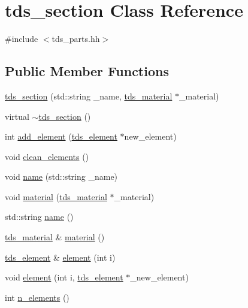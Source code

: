 \hypertarget{classtds__section}{\section{tds\-\_\-section Class Reference}
\label{classtds__section}
}


{\ttfamily \#include $<$tds\-\_\-parts.\-hh$>$}

\subsection*{Public Member Functions}
\begin{DoxyCompactItemize}
\item 
\hyperlink{classtds__section_ab65969b3d4b2950a5f3d2178c92c6554}{tds\-\_\-section} (std\-::string \-\_\-name, \hyperlink{classtds__material}{tds\-\_\-material} $\ast$\-\_\-material)
\item 
virtual \hyperlink{classtds__section_aa81d43b2bda7a4bff6f21003f9dd6c62}{$\sim$tds\-\_\-section} ()
\item 
int \hyperlink{classtds__section_ac7f7a6748643e80fe3380c342e146cd7}{add\-\_\-element} (\hyperlink{classtds__element}{tds\-\_\-element} $\ast$new\-\_\-element)
\item 
void \hyperlink{classtds__section_ae177ecffb63403be5318c081340b0215}{clean\-\_\-elements} ()
\item 
void \hyperlink{classtds__section_ab5ed7bcffdcf61ac015a82c02cda876e}{name} (std\-::string \-\_\-name)
\item 
void \hyperlink{classtds__section_a6da38cfd02f9ef8f8d04fc71da2623fd}{material} (\hyperlink{classtds__material}{tds\-\_\-material} $\ast$\-\_\-material)
\item 
std\-::string \hyperlink{classtds__section_aee79d0125477377b79482b60fbc20fd5}{name} ()
\item 
\hyperlink{classtds__material}{tds\-\_\-material} \& \hyperlink{classtds__section_a0cfa87f9a83bc0535bb08bdbc5c8700c}{material} ()
\item 
\hyperlink{classtds__element}{tds\-\_\-element} \& \hyperlink{classtds__section_acd171d99c4648513baadcbfd994ea301}{element} (int i)
\item 
void \hyperlink{classtds__section_a429ae2483cc8952120b2a9d828aab405}{element} (int i, \hyperlink{classtds__element}{tds\-\_\-element} $\ast$\-\_\-new\-\_\-element)
\item 
int \hyperlink{classtds__section_a8aa5f42733f88e55f360f98aeb343890}{n\-\_\-elements} ()
\end{DoxyCompactItemize}


